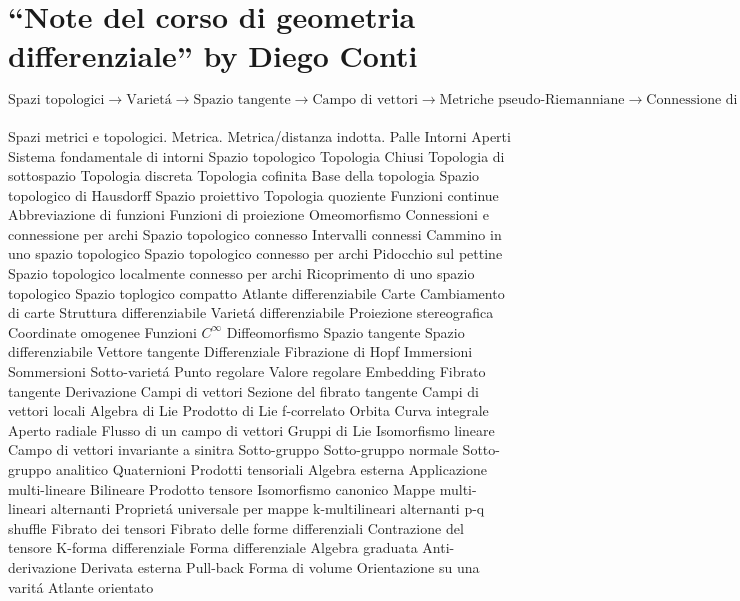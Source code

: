 




\section{``Note del corso di geometria differenziale'' by Diego Conti}

\begin{equation*}
  \boxed{
  \text{Spazi topologici}
  \to \text{Variet\'a}
  \to \text{Spazio tangente}
  \to \text{Campo di vettori}
  \to \text{Metriche pseudo-Riemanniane}
  \to \text{Connessione di Levi-Civita}
  \to \text{Curvatura}
}
\end{equation*}
\\
Spazi metrici e topologici.
Metrica.
Metrica/distanza indotta.
Palle
Intorni
Aperti
Sistema fondamentale di intorni
Spazio topologico
Topologia
Chiusi
Topologia di sottospazio
Topologia discreta
Topologia cofinita
Base della topologia
Spazio topologico di Hausdorff
Spazio proiettivo
Topologia quoziente
Funzioni continue
Abbreviazione di funzioni
Funzioni di proiezione
Omeomorfismo
Connessioni e connessione per archi
Spazio topologico connesso
Intervalli connessi
Cammino in uno spazio topologico
Spazio topologico connesso per archi
Pidocchio sul pettine
Spazio topologico localmente connesso per archi
Ricoprimento di uno spazio topologico
Spazio toplogico compatto
Atlante differenziabile
Carte
Cambiamento di carte
Struttura differenziabile
Variet\'a differenziabile
Proiezione stereografica
Coordinate omogenee
Funzioni $C^\infty$
Diffeomorfismo
Spazio tangente
Spazio differenziabile
Vettore tangente
Differenziale
Fibrazione di Hopf
Immersioni
Sommersioni
Sotto-variet\'a
Punto regolare
Valore regolare
Embedding
Fibrato tangente
Derivazione
Campi di vettori
Sezione del fibrato tangente
Campi di vettori locali
Algebra di Lie
Prodotto di Lie
f-correlato
Orbita
Curva integrale
Aperto radiale
Flusso di un campo di vettori
Gruppi di Lie
Isomorfismo lineare
Campo di vettori invariante a sinitra
Sotto-gruppo
Sotto-gruppo normale
Sotto-gruppo analitico
Quaternioni
Prodotti tensoriali
Algebra esterna
Applicazione multi-lineare
Bilineare
Prodotto tensore
Isomorfismo canonico
Mappe multi-lineari alternanti
Propriet\'a universale per mappe k-multilineari alternanti
p-q shuffle
Fibrato dei tensori
Fibrato delle forme differenziali
Contrazione del tensore
K-forma differenziale
Forma differenziale
Algebra graduata
Anti-derivazione
Derivata esterna
Pull-back
Forma di volume
Orientazione su una varit\'a
Atlante orientato
